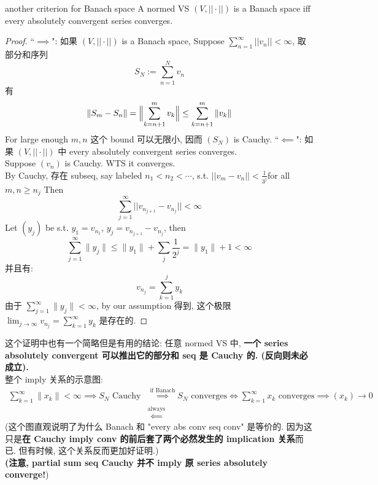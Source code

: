 \documentclass[lang=cn,11pt]{elegantbook}
\begin{document}
\begin{theorem}{another criterion for Banach space}
\label{Equiv Condition for space being Banach}
    A normed VS $(V,||\cdot||)$ is a Banach space iff every absolutely convergent series converges.
\end{theorem}
\begin{proof}
    ``$\implies$": 如果 $(V,||\cdot||)$ is a Banach space,   Suppose $\sum_{n=1}^\infty ||v_n|| < \infty$, 取部分和序列 \[
    S_N := \sum_{n=1}^N v_n 
    \]有 \[
   \|S_m - S_n\| = \Bigl\|\sum_{k=n+1}^m v_k\Bigr\|
   \le \sum_{k=n+1}^m \|v_k\|\]
 For  large enough $m,n$ 这个 bound 可以无限小, 因而 $(S_N)$ is Cauchy. 
    ``$\impliedby$": 如果 $(V,||\cdot||)$ 中 every absolutely convergent series converges.\\
    Suppose $(v_n)$ is Cauchy. WTS it converges.\\
By Cauchy, 存在 subseq, say labeled $n_1 < n_2 < \cdots $, s.t. $||v_{m} - v_{n}|| < \frac{1}{3^j} $for all $m,n\geq n_j$
    Then \[
    \sum_{j=1}^\infty ||v_{n_{j+1}} - v_{n_j}|| < \infty
    \]
    Let $(y_j)$ be s.t. $y_1 = v_{n_1}$, $y_j = v_{n_{j+1}} - v_{n_j}$, then \[
\sum_{j=1}^\infty \| y_j\| \leq \| y_1 \| + \sum_j {\frac{1}{2^j}}  = \|y_1\| + 1 < \infty
  \]
并且有: \[
    v_{n_j} = \sum_{k=1}^j y_k
    \]由于 $\sum_{j=1}^\infty \| y_j\| < \infty$, by our assumption 得到, 这个极限 $    \lim_{j\to \infty} v_{n_j}  = \sum_{k=1}^\infty y_k $ 是存在的.
\end{proof}
\begin{remark}
    这个证明中也有一个简略但是有用的结论: 任意 normed VS 中, \textbf{一个 series absolutely convergent 可以推出它的部分和 seq 是 Cauchy 的. (反向则未必成立).}\\
    整个 imply 关系的示意图:
\begin{align*}
    \sum_{k=1}^{\infty} \|x_k\| <\infty   \implies S_N  \text{ Cauchy}& \overset{\text{if Banach}}{\implies}  S_N \text{ converges}  \Longleftrightarrow  \sum_{k=1}^{\infty} x_k\text{ converges} \implies (x_k) \to 0
        \\    &\overset{\text{always}}{\impliedby}
    \end{align*}
(这个图直观说明了为什么 Banach 和 "every abs conv seq conv" 是等价的. 因为这只是\textbf{在 Cauchy imply conv 的前后套了两个必然发生的 implication 关系}而已. 但有时候, 这个关系反而更加好证明.)\\
\textbf{(注意, partial sum seq Cauchy 并不 imply 原 series absolutely converge!})
\end{remark}
\end{document}
